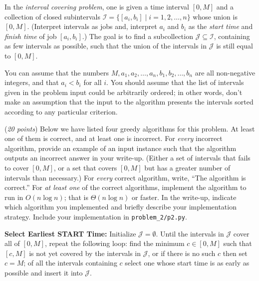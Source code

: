 \documentclass{hw_template}
\begin{document}
\begin{problem}
In the {\em interval covering problem},
one is given a time interval $[0,M]$
and a collection of closed subintervals
$\mathcal{I} = \{[a_i,b_i] \mid i=1,2,\ldots,n\}$
whose union is $[0,M]$. (Interpret intervals as jobs
and, interpret $a_i$ and $b_i$ as the {\em start time}
and {\em finish time} of job $[a_i,b_i]$.)
The goal is to find a subcollection
$\mathcal{J} \subseteq \mathcal{I}$, containing
as few intervals as possible, such that
the union of the intervals in $\mathcal{J}$
is still equal to $[0,M]$.

You can assume that the
numbers $M,a_1,a_2,\ldots,a_n,b_1,b_2,\ldots,b_n$
are all non-negative integers, and that
$a_i < b_i$ for all $i$. You should assume
that the list of intervals given in the
problem input could be arbitrarily ordered;
in other words, don't make an assumption that
the input to the algorithm presents the intervals
sorted according to any particular criterion.

(\textit{20 points}) Below we have listed four greedy algorithms for
this problem. At least one of them is correct,
and at least one is incorrect. For {\em every} incorrect
algorithm, provide an example of an input instance
such that the algorithm outputs an incorrect answer
in your write-up.
(Either a set of intervals that fails to cover $[0,M]$,
or a set that covers $[0,M]$ but has a greater number
of intervals than necessary.) For {\em every} correct
algorithm, write, ``The algorithm is correct.''
For {\em at least one} of the correct algorithms,
implement the algorithm to run in $O(n \log n)$; that is 
$\Theta(n \log n)$ or faster.
In the write-up, indicate which algorithm you implemented
and briefly describe your implementation strategy. Include your implementation in \texttt{problem\_2/p2.py}.

  \begin{subproblem}
    \textbf{Select Earliest START Time:}
  Initialize $\mathcal{J}=\emptyset$.
  Until the intervals in $\mathcal{J}$ cover all of $[0,M]$,
  repeat the following loop: find the minimum $c \in [0,M]$
  such that $[c,M]$ is not yet covered by the intervals in $\mathcal{J}$,
  or if there is no such $c$ then set $c=M$; of all the intervals
  containing $c$ select one whose start time is as early as 
  possible and insert it into $\mathcal{J}$.
  \end{subproblem}


\end{problem}
\end{document}
